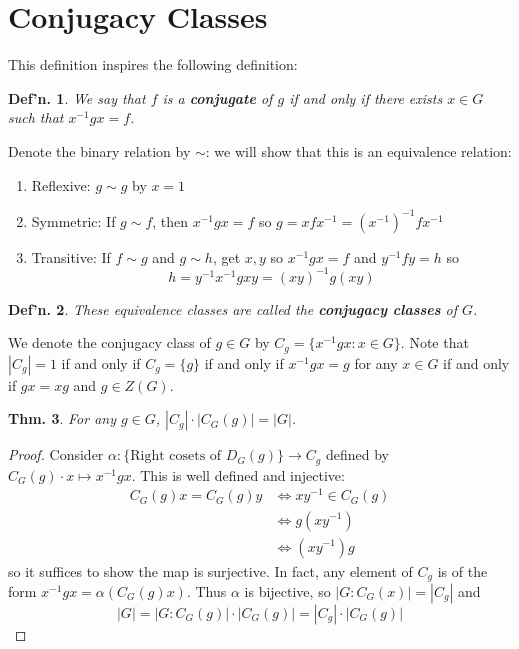 \documentclass[12pt, a4paper]{book}
\newtheorem{theorem}{Thm.}[section]
\newtheorem{definition}[theorem]{Def'n.}
\theoremstyle{nonumberplain}
\newtheorem{proof}{Proof}
\begin{document}
\section{Conjugacy Classes}
This definition inspires the following definition:
\begin{definition}
    We say that $f$ is a \textbf{conjugate} of $g$ if and only if there exists $x\in G$ such that $x^{-1}gx=f$.
\end{definition}
Denote the binary relation by $\sim$: we will show that this is an equivalence relation:
\begin{enumerate}[nolistsep]
    \item Reflexive: $g\sim g$ by $x=1$
    \item Symmetric: If $g\sim f$, then $x^{-1}gx=f$ so $g=xfx^{-1}=(x^{-1})^{-1}fx^{-1}$
    \item Transitive: If $f\sim g$ and $g\sim h$, get $x,y$ so $x^{-1}gx=f$ and $y^{-1}fy=h$ so
        \[h=y^{-1}x^{-1}gxy=(xy)^{-1}g(xy)\]
\end{enumerate}
\begin{definition}
    These equivalence classes are called the \textbf{conjugacy classes} of $G$.
\end{definition}
We denote the conjugacy class of $g\in G$ by $C_g=\{x^{-1}gx:x\in G\}$.
Note that $|C_g|=1$ if and only if $C_g=\{g\}$ if and only if $x^{-1}gx=g$ for any $x\in G$ if and only if $gx=xg$ and $g\in Z(G)$.
\begin{theorem}
    For any $g\in G$, $|C_g|\cdot|C_G(g)|=|G|$.
\end{theorem}
\begin{proof}
    Consider $\alpha:\{\text{Right cosets of $D_G(g)$}\}\longrightarrow C_g$ defined by $C_G(g)\cdot x\mapsto x^{-1}gx$.
    This is well defined and injective:
    \begin{align*}
        C_G(g)x=C_G(g)y &\Leftrightarrow xy^{-1}\in C_G(g)\\
                        &\Leftrightarrow g(xy^{-1})\\
                        &\Leftrightarrow (xy^{-1})g
    \end{align*}
    so it suffices to show the map is surjective.
    In fact, any element of $C_g$ is of the form $x^{-1}gx=\alpha(C_G(g)x)$.
    Thus $\alpha$ is bijective, so $|G:C_G(x)|=|C_g|$ and
    \begin{equation*}
        |G|=|G:C_G(g)|\cdot|C_G(g)|=|C_g|\cdot|C_G(g)|
    \end{equation*}
\end{proof}
\end{document}
